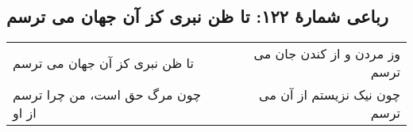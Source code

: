 \begin{center}
\section*{رباعی شمارهٔ ۱۲۲:  تا ظن نبری کز آن جهان می ترسم}
\label{sec:122}
\begin{longtable}{l p{0.5cm} r}
 تا ظن نبری کز آن جهان می ترسم
&&
وز مردن و از کندن جان می ترسم
\\
چون مرگ حق است، من چرا ترسم از او
&&
چون نیک نزیستم از آن می ترسم
\\
\end{longtable}
\end{center}
